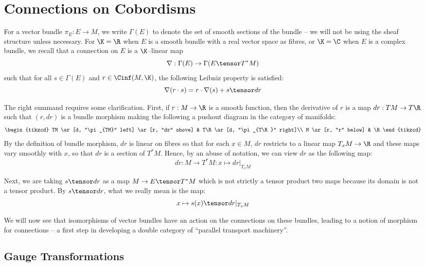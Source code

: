 \documentclass[\PRJWD/Thick_TQFTs_and_Quantum_Information.tex]{subfiles}
\begin{document}
\section{Connections on Cobordisms}

For a vector bundle $\pi_E : E \to M$, we write $\Gamma(E)$ to denote the set of
smooth sections of the bundle -- we will not be using the sheaf structure unless
necessary. For $\K = \R$ when $E$ is a smooth bundle with a real vector space as
fibres, or $\K = \C$ when $E$ is a complex bundle, we recall that a connection
\cite{Conn} on $E$ is a $\K$--linear map
\[
  \nabla : \Gamma(E) \to \Gamma(E \tensor T^*M)
\]
such that for all $s \in \Gamma(E)$ and $r \in \Cinf(M, \K)$, the following
Leibniz property is satisfied:
\[
  \nabla(r \cdot s) = r \cdot \nabla(s) + s \tensor dr
\]

The right summand requires some clarification.
First, if $r : M \to \R$ is a smooth function, then the derivative of $r$ is a
map $dr : TM \to T\R$ such that $(r, dr)$ is a bundle morphism making the
following a pushout diagram in the category of manifolds:
\[\begin{tikzcd}
TM \ar[d, "\pi_{TM}" left] \ar[r, "dr" above] & T\R \ar[d, "\pi_{T\R}" right]\\
M \ar[r, "r" below] & \R
\end{tikzcd}\]
By the definition of bundle morphism, $dr$ is linear on fibres so that for each
$x \in M$, $dr$ restricts to a linear map $T_xM \to \R$ and these maps vary
smoothly with $x$, so that $dr$ is a section of $T^*M$. Hence, by an abuse of
notation, we can view $dr$ as the following map:
\[
  dr : M \to T^*M : x \mapsto dr|_{T_xM}
\]

Next, we are taking $s \tensor dr$ as a map $M \to E \tensor T^*M$ which is not
strictly a tensor product two maps because its domain is not a tensor product.
By $s \tensor dr$, what we really mean is the map:
\begin{equation}\label{eqn:conn_tensor}
  x \mapsto s(x) \tensor dr|_{T_xM}
\end{equation}

We will now see that isomorphisms of vector bundles have an action on the
connections on these bundles, leading to a notion of morphism for connections --
a first step in developing a double category of
``parallel transport machinery''.

\subsection{Gauge Transformations}
\end{document}

